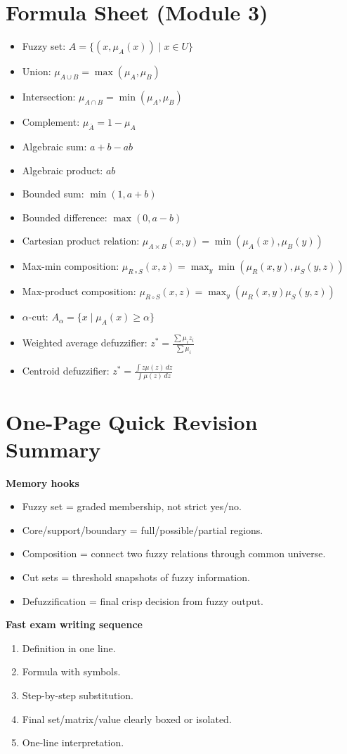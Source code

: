 \documentclass[11pt,a4paper]{article}
\begin{document}
\section*{Formula Sheet (Module 3)}
\begin{itemize}
\item Fuzzy set: $A=\{(x,\mu_A(x))\mid x\in U\}$
\item Union: $\mu_{A\cup B}=\max(\mu_A,\mu_B)$
\item Intersection: $\mu_{A\cap B}=\min(\mu_A,\mu_B)$
\item Complement: $\mu_{\bar A}=1-\mu_A$
\item Algebraic sum: $a+b-ab$
\item Algebraic product: $ab$
\item Bounded sum: $\min(1,a+b)$
\item Bounded difference: $\max(0,a-b)$
\item Cartesian product relation: $\mu_{A\times B}(x,y)=\min(\mu_A(x),\mu_B(y))$
\item Max-min composition: $\mu_{R\circ S}(x,z)=\max_y\min(\mu_R(x,y),\mu_S(y,z))$
\item Max-product composition: $\mu_{R\circ S}(x,z)=\max_y(\mu_R(x,y)\mu_S(y,z))$
\item $\alpha$-cut: $A_\alpha=\{x\mid\mu_A(x)\ge\alpha\}$
\item Weighted average defuzzifier: $z^*=\frac{\sum\mu_i z_i}{\sum\mu_i}$
\item Centroid defuzzifier: $z^*=\frac{\int z\mu(z)\,dz}{\int \mu(z)\,dz}$
\end{itemize}

\section*{One-Page Quick Revision Summary}
\textbf{Memory hooks}
\begin{itemize}
\item Fuzzy set = graded membership, not strict yes/no.
\item Core/support/boundary = full/possible/partial regions.
\item Composition = connect two fuzzy relations through common universe.
\item Cut sets = threshold snapshots of fuzzy information.
\item Defuzzification = final crisp decision from fuzzy output.
\end{itemize}

\textbf{Fast exam writing sequence}
\begin{enumerate}
\item Definition in one line.
\item Formula with symbols.
\item Step-by-step substitution.
\item Final set/matrix/value clearly boxed or isolated.
\item One-line interpretation.
\end{enumerate}
\end{document}
